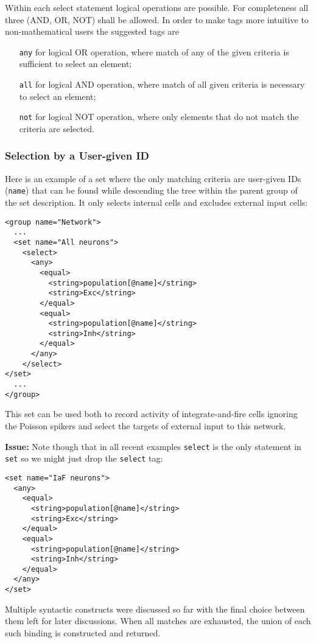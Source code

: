 \documentclass{article}
\newcommand{\issue}[1]{%
\begin{center}
\colorbox{issuecolor}{\parbox{0.8\linewidth}{\textbf{Issue:} #1}}
\end{center}%
}
\begin{document}
Within each select statement logical operations are possible. For completeness
all three (AND, OR, NOT) shall be allowed. In order to make tags more intuitive
to non-mathematical users the suggested tags are
\begin{itemize}
\item[\tt any] {for logical OR operation, where match of any of the given criteria
is sufficient to select an element;}
\item[\tt all] {for logical AND operation, where match of all given criteria is
necessary to select an element;}
\item[\tt not] {for logical NOT operation, where only elements that do not match
the criteria are selected.}
\end{itemize}

\subsubsection{Selection by a User-given ID}

Here is an example of a set where the only matching criteria are user-given IDs
({\tt name}) that can be found while descending the tree within the parent group
of the set description. It only selects internal cells and excludes external
input cells:
\begin{verbatim}
<group name="Network">
  ...
  <set name="All neurons">
    <select>
      <any>
        <equal>
          <string>population[@name]</string>
          <string>Exc</string>
        </equal>
        <equal>
          <string>population[@name]</string>
          <string>Inh</string>
        </equal>
      </any>
    </select>
</set>
  ...
</group>
\end{verbatim}
This set can be used both to record activity of integrate-and-fire cells ignoring the
Poisson spikers and select the targets of external input to this network.

\issue{Note though that in all recent examples {\tt select} is the only statement in
{\tt set} so we might just drop the {\tt select} tag:}
\begin{verbatim}
<set name="IaF neurons">
  <any>
    <equal>
      <string>population[@name]</string>
      <string>Exc</string>
    </equal>
    <equal>
      <string>population[@name]</string>
      <string>Inh</string>
    </equal>
  </any>
</set>
\end{verbatim}


Multiple syntactic constructs were discussed so far with the final choice between
them left for later discussions. When all matches are exhausted, the union of each
such binding is constructed and returned.
\end{document}
